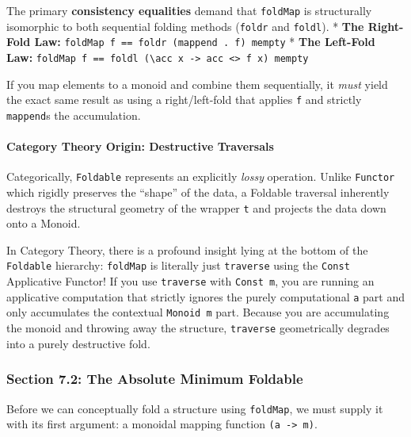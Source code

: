 \documentclass[
]{article}
\begin{document}
The primary \textbf{consistency equalities} demand that \texttt{foldMap}
is structurally isomorphic to both sequential folding methods
(\texttt{foldr} and \texttt{foldl}). * \textbf{The Right-Fold Law:}
\texttt{foldMap\ f\ ==\ foldr\ (mappend\ .\ f)\ mempty} * \textbf{The
Left-Fold Law:}
\texttt{foldMap\ f\ ==\ foldl\ (\textbackslash{}acc\ x\ -\textgreater{}\ acc\ \textless{}\textgreater{}\ f\ x)\ mempty}

If you map elements to a monoid and combine them sequentially, it
\emph{must} yield the exact same result as using a right/left-fold that
applies \texttt{f} and strictly \texttt{mappend}s the accumulation.

\paragraph{Category Theory Origin: Destructive
Traversals}\label{category-theory-origin-destructive-traversals}

Categorically, \texttt{Foldable} represents an explicitly \emph{lossy}
operation. Unlike \texttt{Functor} which rigidly preserves the ``shape''
of the data, a Foldable traversal inherently destroys the structural
geometry of the wrapper \texttt{t} and projects the data down onto a
Monoid.

In Category Theory, there is a profound insight lying at the bottom of
the \texttt{Foldable} hierarchy: \texttt{foldMap} is literally just
\texttt{traverse} using the \texttt{Const} Applicative Functor! If you
use \texttt{traverse} with \texttt{Const\ m}, you are running an
applicative computation that strictly ignores the purely computational
\texttt{a} part and only accumulates the contextual \texttt{Monoid\ m}
part. Because you are accumulating the monoid and throwing away the
structure, \texttt{traverse} geometrically degrades into a purely
destructive fold.

\subsubsection{Section 7.2: The Absolute Minimum
Foldable}\label{section-7.2-the-absolute-minimum-foldable}

Before we can conceptually fold a structure using \texttt{foldMap}, we
must supply it with its first argument: a monoidal mapping function
\texttt{(a\ -\textgreater{}\ m)}.
\end{document}
